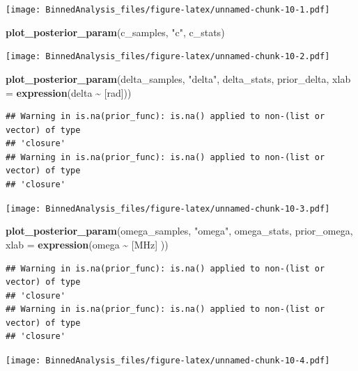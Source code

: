 \documentclass[
]{article}
\newenvironment{Shaded}{\begin{snugshade}}{\end{snugshade}}
\newcommand{\AttributeTok}[1]{\textcolor[rgb]{0.13,0.29,0.53}{#1}}
\newcommand{\FunctionTok}[1]{\textcolor[rgb]{0.13,0.29,0.53}{\textbf{#1}}}
\newcommand{\NormalTok}[1]{#1}
\newcommand{\SpecialCharTok}[1]{\textcolor[rgb]{0.81,0.36,0.00}{\textbf{#1}}}
\newcommand{\StringTok}[1]{\textcolor[rgb]{0.31,0.60,0.02}{#1}}
\begin{document}
\texttt{[image: BinnedAnalysis\_files/figure-latex/unnamed-chunk-10-1.pdf]}

\begin{Shaded}
\begin{Highlighting}[]
\FunctionTok{plot\_posterior\_param}\NormalTok{(c\_samples, }\StringTok{"c"}\NormalTok{, c\_stats)}
\end{Highlighting}
\end{Shaded}

\texttt{[image: BinnedAnalysis\_files/figure-latex/unnamed-chunk-10-2.pdf]}

\begin{Shaded}
\begin{Highlighting}[]
\FunctionTok{plot\_posterior\_param}\NormalTok{(delta\_samples, }\StringTok{"delta"}\NormalTok{, delta\_stats, prior\_delta, }\AttributeTok{xlab =} \FunctionTok{expression}\NormalTok{(delta }\SpecialCharTok{\textasciitilde{}} \StringTok{\textquotesingle{}[rad]\textquotesingle{}}\NormalTok{))}
\end{Highlighting}
\end{Shaded}

\begin{verbatim}
## Warning in is.na(prior_func): is.na() applied to non-(list or vector) of type
## 'closure'
## Warning in is.na(prior_func): is.na() applied to non-(list or vector) of type
## 'closure'
\end{verbatim}

\texttt{[image: BinnedAnalysis\_files/figure-latex/unnamed-chunk-10-3.pdf]}

\begin{Shaded}
\begin{Highlighting}[]
\FunctionTok{plot\_posterior\_param}\NormalTok{(omega\_samples, }\StringTok{"omega"}\NormalTok{, omega\_stats, prior\_omega, }\AttributeTok{xlab =} \FunctionTok{expression}\NormalTok{(omega }\SpecialCharTok{\textasciitilde{}} \StringTok{\textquotesingle{}[MHz]\textquotesingle{}}\NormalTok{ ))}
\end{Highlighting}
\end{Shaded}

\begin{verbatim}
## Warning in is.na(prior_func): is.na() applied to non-(list or vector) of type
## 'closure'
## Warning in is.na(prior_func): is.na() applied to non-(list or vector) of type
## 'closure'
\end{verbatim}

\texttt{[image: BinnedAnalysis\_files/figure-latex/unnamed-chunk-10-4.pdf]}
\end{document}
